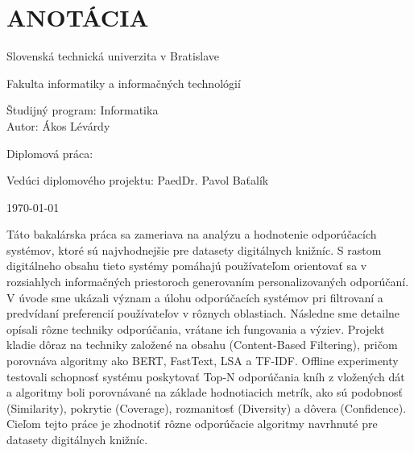 \documentclass[\myFontSize,a4paper,oneside,english,hidelinks]{article}
\begin{document}
\newpage{}
\thispagestyle{empty}
\mbox{}

\newpage{}
\thispagestyle{empty}
\section*{ANOTÁCIA}
\begin{minipage}[t]{1\columnwidth}%
Slovenská technická univerzita v Bratislave

Fakulta informatiky a informačných technológií

Študijný program: Informatika\\

Autor: Ákos Lévárdy

Diplomová práca: \thesisTitle

Vedúci diplomového projektu: PaedDr. Pavol Baťalík

\today%
\end{minipage}
\bigskip{}

Táto bakalárska práca sa zameriava na analýzu a hodnotenie odporúčacích systémov, ktoré sú najvhodnejšie pre datasety digitálnych knižníc. S rastom digitálneho obsahu tieto systémy pomáhajú používateľom orientovať sa v rozsiahlych informačných priestoroch generovaním personalizovaných odporúčaní. V úvode sme ukázali význam a úlohu odporúčacích systémov pri filtrovaní a predvídaní preferencií používateľov v rôznych oblastiach. Následne sme detailne opísali rôzne techniky odporúčania, vrátane ich fungovania a výziev. Projekt kladie dôraz na techniky založené na obsahu (Content-Based Filtering), pričom porovnáva algoritmy ako BERT, FastText, LSA a TF-IDF. Offline experimenty testovali schopnosť systému poskytovať Top-N odporúčania kníh z vložených dát a algoritmy boli porovnávané na základe hodnotiacich metrík, ako sú podobnosť (Similarity), pokrytie (Coverage), rozmanitosť (Diversity) a dôvera (Confidence). Cieľom tejto práce je zhodnotiť rôzne odporúčacie algoritmy navrhnuté pre datasety digitálnych knižníc.

\end{document}

